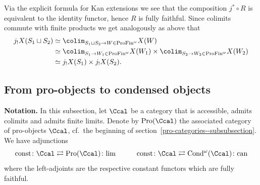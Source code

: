 \documentclass[colorinlistoftodos,article,11pt,reqno]{article}
\newcommand{\Pro}{\textup{Pro}}
\newcommand{\Cond}{\textup{Cond}}
\newcommand{\ProFin}{\textup{ProFin}}
\renewcommand{\to}[1][]{\overset{#1}{\rightarrow}}
\begin{document}
\begin{appendix}
\begin{remark}
Via the explicit formula for Kan extensions we see that the composition $j^*\circ R$ is equivalent to the identity functor, hence $R$ is fully faithful.
Since colimits commute with finite products we get analogously as above that
\begin{align*}
    j_!X(S_1\sqcup S_2) 
    &\simeq \colim_{S_1\sqcup S_2 \to W\in\ProFin^\omega} X(W) \\
    &\simeq \colim_{S_1 \to W_1\in\ProFin^\omega} X(W_1) \times \colim_{S_2 \to W_2\in\ProFin^\omega} X(W_2) \\
    &\simeq j_!X(S_1) \times j_!X(S_2).
\end{align*} 
\end{remark} 




\subsection{From pro-objects to condensed objects}



\textbf{Notation.} In this subsection, let $\Ccal$  be a category that is accessible, admits colimits and admits finite limits.
Denote by $\Pro(\Ccal)$ the associated category of pro-objects $\Ccal$, cf.\ the beginning of section~\ref{pro-categories--subsubsection}.
We have adjunctions
	\[
	\textup{const} \colon \Ccal \rightleftarrows \Pro(\Ccal) \colon \textup{lim}\quad\quad\quad \textup{const}\colon\Ccal \rightleftarrows \Cond^{\omega}(\Ccal) \colon\textup{can}
	\]
where the left-adjoints are the respective constant functors which are fully faithful.


\end{appendix}
\end{document}
